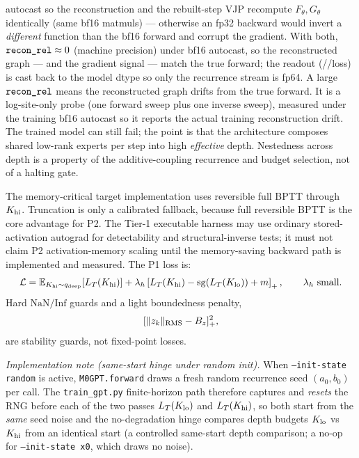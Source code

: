 \documentclass[11pt]{article}
\newcommand{\E}{\mathbb{E}}
\newcommand{\sg}{\operatorname{sg}}
\newcommand{\code}[1]{\texttt{#1}}
\begin{document}
autocast so the reconstruction and the rebuilt-step VJP recompute \(F_\theta,G_\theta\) identically
(same bf16 matmuls) --- otherwise an fp32 backward would invert a \emph{different} function than the
bf16 forward and corrupt the gradient.  With both, \(\code{\detokenize{recon_rel}}\approx0\) (machine
precision) under bf16 autocast, so the reconstructed graph --- and the gradient signal --- match the
true forward; the readout (\code{}/\code{}/loss) is cast
back to the model dtype so only the recurrence stream is fp64.  A large
\(\code{\detokenize{recon_rel}}\) means the reconstructed graph drifts from the true forward.  It is a
log-site-only probe (one forward sweep plus one inverse sweep), measured under the training bf16
autocast so it reports the actual training reconstruction drift.
The trained model can still fail; the point is that the architecture composes
shared low-rank experts per step into high \emph{effective} depth.  Nestedness across depth is a
property of the additive-coupling recurrence and budget selection, not of a halting gate.

The memory-critical target implementation uses reversible full BPTT through \(K_{\rm hi}\).
Truncation is only a calibrated fallback, because full reversible BPTT is the core advantage for
P2.  The Tier-1 executable harness may use ordinary stored-activation autograd for detectability
and structural-inverse tests; it must not claim P2 activation-memory scaling until the
memory-saving backward path is implemented and measured.  The P1 loss is:
\begin{equation}
  \mathcal L
  =
  \E_{K_{\rm hi}\sim q_{\rm deep}}\!\left[L_T(K_{\rm hi})\right]
  +
  \lambda_h
  \left[
    L_T(K_{\rm hi})-\sg(L_T(K_{\rm lo}))+m
  \right]_+,
  \qquad
  \lambda_h\ \text{small}.
  \label{eq:p1-loss}
\end{equation}
Hard \(\mathrm{NaN}/\mathrm{Inf}\) guards and a light boundedness penalty,
\[
  [\|z_k\|_{\rm RMS}-B_z]_+^2,
\]
are stability guards, not fixed-point losses.

\emph{Implementation note (same-start hinge under random init).}  When
\code{--init-state random} is active, \code{M0GPT.forward} draws a fresh random
recurrence seed \((a_0,b_0)\) per call.  The \code{train\_gpt.py} finite-horizon
path therefore captures and \emph{resets} the RNG before each of the two passes
\(L_T(K_{\rm lo})\) and \(L_T(K_{\rm hi})\), so both start from the \emph{same}
seed noise and the no-degradation hinge compares depth budgets \(K_{\rm lo}\) vs
\(K_{\rm hi}\) from an identical start (a controlled same-start depth comparison;
a no-op for \code{--init-state x0}, which draws no noise).
\end{document}
